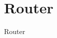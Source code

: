 \documentclass[t]{beamer}
\begin{document}
\section{Router}

\begin{frame}{Router}
    \begin{columns}[T]
        \begin{column}{0.15\textwidth}
            ~
        \end{column}
        \begin{column}{0.35\textwidth}
            \vspace{1.2mm}
        \end{column}
        \begin{column}{0.35\textwidth}
            \vspace{1.2mm}
        \end{column}
        \begin{column}{0.15\textwidth}
            ~
        \end{column}
    \end{columns}
\end{frame}
\end{document}
